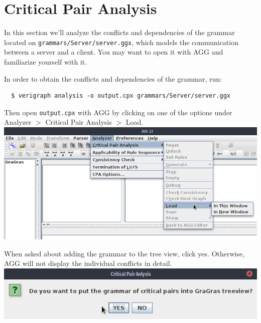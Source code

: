 \documentclass[12pt]{article}
\newenvironment{tutorialstep}
	{\hspace{-\parindent}\begin{minipage}{\textwidth}}
    {\vspace{.3cm}\end{minipage}}
\begin{document}
\section{Critical Pair Analysis}

In this section we'll analyze the conflicts and dependencies of the grammar located on \texttt{grammars/Server/server.ggx}, which models the communication between a server and a client. You may want to open it with AGG and familiarize yourself with it.

In order to obtain the conflicts and dependencies of the grammar, run:

\begin{verbatim}
  $ verigraph analysis -o output.cpx grammars/Server/server.ggx
\end{verbatim}

\begin{tutorialstep}
Then open \texttt{output.cpx} with AGG by clicking on one of the options under Analyzer $>$ Critical Pair Analysis $>$ Load. \\

\noindent
\centering
\includegraphics[scale = 0.5]{cpa_01.png}
\end{tutorialstep}

\begin{tutorialstep}
When asked about adding the grammar to the tree view, click yes. Otherwise, AGG will not display the individual conflicts in detail. \\

\noindent
\centering
\includegraphics[scale = 0.6]{cpa_02.png}
\end{tutorialstep}
\end{document}
